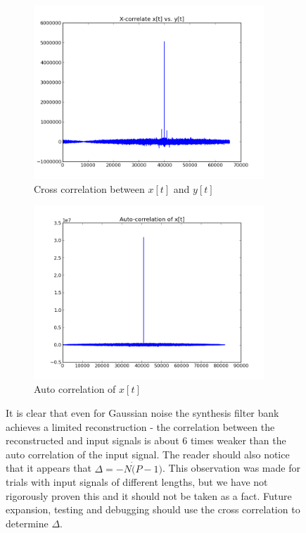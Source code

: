 \documentclass[a4paper,10pt]{article}
\begin{document}
\begin{figure}
 \begin{subfigure}{0.5\textwidth}
  \includegraphics[width=0.95\textwidth]{x_cor.png}
  \caption{Cross correlation between $x[t]$ and $y[t]$}
 \end{subfigure}
 \begin{subfigure}{0.5\textwidth}
  \includegraphics[width=0.95\textwidth]{auto_cor.png}
  \caption{Auto correlation of $x[t]$}
 \end{subfigure}
\caption{It is clear that even for Gaussian noise the synthesis filter bank achieves a limited reconstruction - the correlation between the reconstructed and input signals is 
about 6 times weaker than the auto correlation of the input signal. The reader should also notice that it appears that $\Delta = -N\dot (P-1)$. This observation was made for 
trials with input signals of different lengths, but we have not rigorously proven this and it should not be taken as a fact. Future expansion, testing and debugging should use
the cross correlation to determine $\Delta$.}
\label{correlation}
\end{figure}
\end{document}
